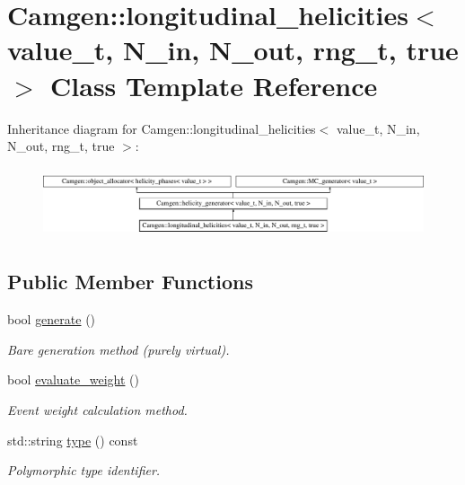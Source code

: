 \hypertarget{a00333}{}\section{Camgen\+:\+:longitudinal\+\_\+helicities$<$ value\+\_\+t, N\+\_\+in, N\+\_\+out, rng\+\_\+t, true $>$ Class Template Reference}
\label{a00333}
Inheritance diagram for Camgen\+:\+:longitudinal\+\_\+helicities$<$ value\+\_\+t, N\+\_\+in, N\+\_\+out, rng\+\_\+t, true $>$\+:\begin{figure}[H]
\begin{center}
\leavevmode
\includegraphics[height=2.084367cm]{a00333}
\end{center}
\end{figure}
\subsection*{Public Member Functions}
\begin{DoxyCompactItemize}
\item 
bool \hyperlink{a00333_a6af00df1327dfe34abae1acf0efba050}{generate} ()
\begin{DoxyCompactList}\small\item\em \textquotesingle{}Bare generation\textquotesingle{} method (purely virtual). \end{DoxyCompactList}\item 
\hypertarget{a00333_a312f5af963c14b25b735ed62c121ab81}{}bool \hyperlink{a00333_a312f5af963c14b25b735ed62c121ab81}{evaluate\+\_\+weight} ()\label{a00333_a312f5af963c14b25b735ed62c121ab81}

\begin{DoxyCompactList}\small\item\em Event weight calculation method. \end{DoxyCompactList}\item 
\hypertarget{a00333_ac72175ee3d4999418bd16fce123d23c4}{}std\+::string \hyperlink{a00333_ac72175ee3d4999418bd16fce123d23c4}{type} () const \label{a00333_ac72175ee3d4999418bd16fce123d23c4}

\begin{DoxyCompactList}\small\item\em Polymorphic type identifier. \end{DoxyCompactList}\end{DoxyCompactItemize}

